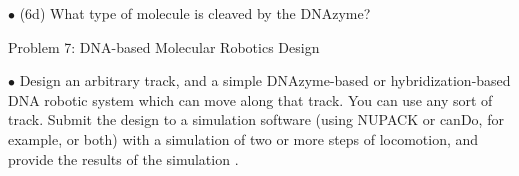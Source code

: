 \documentclass{article}
\begin{document}
$\bullet$ (6d) What type of molecule is cleaved by the DNAzyme?\\







\newpage
\centerline{\sc Problem 7:  DNA-based Molecular Robotics Design}
\vspace{0.2in}


$\bullet$ Design an arbitrary track, and a simple DNAzyme-based or hybridization-based DNA robotic system which can move along that track. You can use any sort of track. Submit the design to a simulation software (using NUPACK or canDo, for example, or both) with a simulation of two or more steps of locomotion, and provide the results of the simulation .




\end{document}

